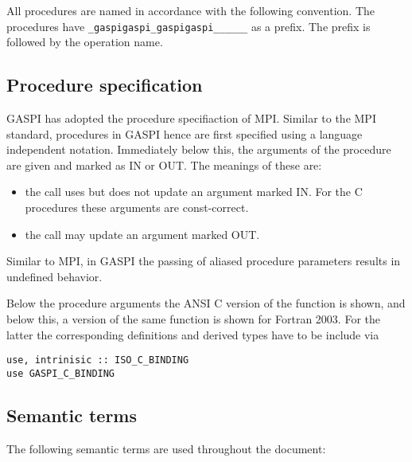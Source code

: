 \documentclass[a4paper]{article}
\makeatletter
\newlength{\st}\setlength{\st}{0pt}
\newcommand{\zerowsep}{\hskip 0pt plus 0.1pt minus 0.1pt}
\newcommand{\ZSEP}[1]{\ifx#1\@@@EOZ@@@\let\next\relax\else\ifx#1\_#1\zerowsep\else#1\fi\let\next\ZSEP\fi\next}
\newcommand{\zsep}[1]{\ZSEP{}#1\@@@EOZ@@@}
\newcommand{\gaspiprefix}{gaspi}
\newcommand{\function}[1]{{\tt #1}}
\newcommand{\gaspifunction}[1]{\function{\protect\zsep{\gaspiprefix\_#1}}}
\newenvironment{cbox}[1]
{\newcommand\colboxcolor{#1}\begin{lrbox}{\riddlebox}\begin{minipage}{\dimexpr\columnwidth-2\fboxsep\relax}}
{\end{minipage}\end{lrbox}\begin{center}\colorbox[HTML]{\colboxcolor}{\usebox{\riddlebox}}\end{center}}
\newenvironment{FDefSign}{\begin{cbox}{EEEEEE}}{\end{cbox}}
\makeatother
\begin{document}
All procedures are named in accordance with the following convention.
The procedures have \gaspifunction{} as a prefix. The prefix is
followed by the operation name.

\subsection{Procedure specification}

GASPI has adopted the procedure specifiaction of MPI. Similar to the
MPI standard, procedures in GASPI hence are first specified using a
language independent notation.  Immediately below this, the arguments
of the procedure are given and marked as IN or OUT. The meanings of
these are:

\begin{itemize}
\item the call uses but does not update an argument marked IN. For the C procedures these arguments are const-correct.
\item the call may update an argument marked OUT.
\end{itemize}

Similar to MPI, in GASPI the passing of aliased procedure parameters
results in undefined behavior.

Below the procedure arguments the ANSI C version of the function is
shown, and below this, a version of the same function is shown for
Fortran 2003. For the latter the corresponding definitions and derived
types have to be include via

\begin{FDefSign}
\begin{verbatim}
use, intrinisic :: ISO_C_BINDING
use GASPI_C_BINDING
\end{verbatim}
\end{FDefSign}



\subsection{Semantic terms}

The following semantic terms are used throughout the document:

\newcommand{\septext}{0.5em}
\newcommand{\gentextwithline}[6]{
\draw (#2,#3) node[left] {#1};
\draw[#6] (#2+\septext+#4,#3) -- +(#5,0);
}
\newcommand{\timeline}[1]{\gentextwithline{Time}{0}{#1}{0}{25em}{->,dashed}}
\newcommand{\operation}[2]{\gentextwithline{Operation}{0}{#1}{1em}{#2}{|-|}}
\newcommand{\gencall}[3]{\gentextwithline{#1}{0}{#2}{0}{#3}{|-|}}
\newcommand{\call}[2]{\gencall{Call}{#1}{#2}}
\newcommand{\calls}[2]{\gencall{Calls}{#1}{#2-10em};
\draw[|-|] (#2-8em,#1) -- +(8em,0);
}
\newcommand{\wait}[3]{\gentextwithline{Wait}{#1}{#2}{0}{#3}{|-|}}
\newcommand{\progress}[2]{\gentextwithline{Progress}{0}{#1}{1em}{#2}{|-|}}
\end{document}
